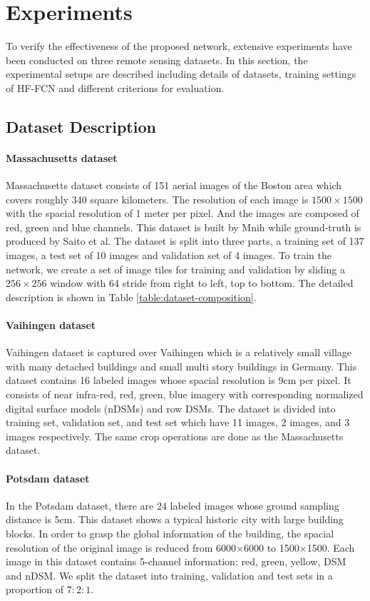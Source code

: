 \section{Experiments}
\label{Sec:exp}

To verify the effectiveness of the proposed network, extensive experiments have been conducted on three remote sensing datasets. In this section, the experimental setups are described including details of datasets, training settings of HF-FCN and different criterions for evaluation.


\subsection{Dataset Description}

\paragraph{Massachusetts dataset}
%
Massachusetts dataset consists of 151 aerial images of the Boston area which covers roughly 340 square kilometers.
The resolution of each image is $1500\times 1500$ with the spacial resolution of 1 meter per pixel. And the images are composed of red, green and blue channels.
This dataset is built by Mnih while ground-truth is produced by Saito et al.
The dataset is split into three parts,  a training set of 137 images, a test set of 10 images and validation set of 4 images.
To train the network, we create a set of image tiles for training and validation by sliding a ${256\times256}$ window with 64 stride from right to left, top to bottom. The detailed description is shown in Table \ref{table:dataset-composition}.

\paragraph{Vaihingen dataset}
%
Vaihingen dataset is captured over Vaihingen which is a relatively small village with many detached buildings and small multi story buildings in Germany.
This dataset contains 16 labeled images whose spacial resolution is 9cm per pixel.
It consists of near infra-red, red, green, blue imagery with corresponding normalized digital surface models (nDSMs) and row DSMs. The dataset is divided into training set, validation set, and test set which have 11 images, 2 images, and 3 images respectively. The same crop operations are done as the Massachusetts dataset.

\paragraph{Potsdam dataset}
%
In the Potsdam dataset, there are 24 labeled images whose ground sampling distance is 5cm.
This dataset shows a typical historic city with large building blocks. In order to grasp the global information of the building, the spacial resolution of the original image is reduced from 6000$\times$6000 to 1500$\times$1500.
Each image in this dataset contains 5-channel information: red, green, yellow, DSM and nDSM.
We split the dataset into training, validation and test sets in a proportion of $7:2:1$.



